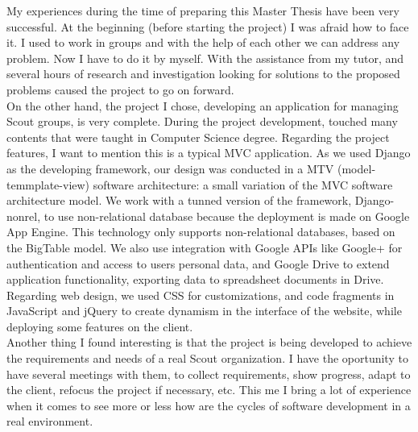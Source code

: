 

My experiences during the time of preparing this Master Thesis have been very successful. At the beginning
(before starting the project) I was afraid how to face it. I used to work in groups and with the help of
each other we can address any problem. Now I have to do it by myself. 
With the assistance from my
tutor, and several hours of research and investigation looking for solutions to the proposed problems caused the project to go on forward.\\

On the other hand, the project I chose, developing an application for managing Scout groups, is very complete.
During the project development,  touched many contents that were taught in Computer Science degree. 
Regarding the project features, I want to mention this is a typical MVC application. As we used Django as the developing  
framework, our design was conducted in a MTV (model-temmplate-view) software architecture: a small variation of the MVC 
software architecture model.
We work with a tunned version of the framework,
Django-nonrel, to use non-relational database because the deployment is made on Google App Engine. This technology
only supports non-relational databases, based on the BigTable model. We also use integration
with Google APIs like Google+  for authentication and access to users personal data, and Google Drive to extend
application functionality, exporting data to spreadsheet documents in Drive. Regarding web design, we used
CSS for customizations, and code fragments in JavaScript and jQuery to create dynamism in the interface of the website,
while deploying some features on the client.\\

Another thing I found interesting is that the project is being developed to achieve the requirements and needs of a real Scout organization.
I have the oportunity to have several meetings with them, to collect requirements, show progress, adapt to the client,
refocus the project if necessary, etc. This me I bring a lot of experience when it comes to see more or less how are the cycles of
software development in a real environment.\\

